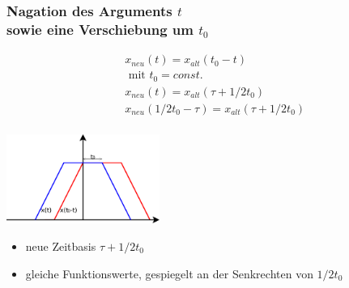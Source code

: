 \begin{multicols}{2}
\subsubsection*{Nagation des Arguments \texorpdfstring{$t$}{} \\ sowie eine Verschiebung um \texorpdfstring{$t_0$}{}}
\begin{align*}
  &x_{neu}\left(t\right) = x_{alt}\left(t_0 - t\right) \\
  &\text{ mit } t_0 = const.\\
  &x_{neu}\left(t\right) = x_{alt}\left(\tau + 1/2 t_0\right)\\
  &x_{neu}\left(1/2 t_0 - \tau\right) = x_{alt}\left(\tau + 1/2 t_0\right)\\
\end{align*}
\vfill
\begin{center}
 \includegraphics[width=50mm,keepaspectratio=true]{./Elektrotechnik/Bilder/argumentversch.pdf}
\end{center}

\end{multicols}
\begin{itemize}
 \item neue Zeitbasis \(\tau + 1/2 t_0\)
 \item gleiche Funktionswerte, gespiegelt an der Senkrechten von \(1/2 t_0\)
\end{itemize}

